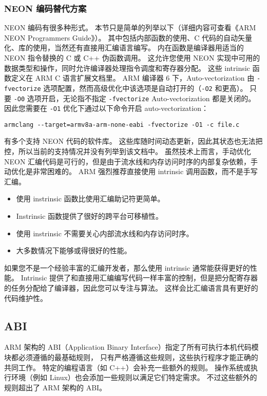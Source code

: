 \subsubsection{NEON 编码替代方案}

NEON 编码有很多种形式。
本节只是简单的列举以下（详细内容可查看《ARM NEON Programmers Guide》）。
其中包括内部函数的使用、C 代码的自动矢量化、库的使用，当然还有直接用汇编语言编写。
内在函数是编译器用适当的 NEON 指令替换的 C 或 C++ 伪函数调用。
这允许您使用 NEON 实现中可用的数据类型和操作，同时允许编译器处理指令调度和寄存器分配。
这些 intrinsic 函数定义在 ARM C 语言扩展文档里。
ARM 编译器 6 下，Auto-vectorization 由 \lstinline!-fvectorize! 选项配置，然而高级优化中该选项是自动打开的（\lstinline!-O2! 和更高）。
只要 \lstinline!-O0! 选项开启，无论指不指定 \lstinline!-fvectorize! Auto-vectorization 都是关闭的。
因此您需要在 \lstinline!-O1! 优化下通过以下命令开启 auto-vectorization：

\lstinline!armclang --target=armv8a-arm-none-eabi -fvectorize -O1 -c file.c!

有多个支持 NEON 代码的软件库。
这些库随时间动态更新，因此其状态也无法把控，所以当前的支持情况并没有列举到该文档中。
虽然技术上而言，手动优化 NEON 汇编代码是可行的，但是由于流水线和内存访问时序的内部复杂依赖，手动优化是非常困难的。
ARM 强烈推荐直接使用 intrinsic 调用函数，而不是手写汇编。

\begin{itemize}
  \item 使用 instrinsic 函数比使用汇编助记符更简单。
  \item Instrinsic 函数提供了很好的跨平台可移植性。
  \item 使用 instrinsic 不需要关心内部流水线和内存访问时序。
  \item 大多数情况下能够或得很好的性能。
\end{itemize}

如果您不是一个经验丰富的汇编开发者，那么使用 intrinsic 通常能获得更好的性能。
Intrinsic 提供了和直接用汇编编写代码一样丰富的控制，但是把分配寄存器的任务分配给了编译器，因此您可以专注与算法。
这样会比汇编语言具有更好的代码维护性。

\subsection{ABI}

ARM 架构的 ABI（Application Binary Interface）指定了所有可执行本机代码模块都必须遵循的最基础规则，
只有严格遵循这些规则，这些执行程序才能正确的共同工作。
特定的编程语言（如 C++）会补充一些额外的规则。
操作系统或执行环境（例如 Linux）也会添加一些规则以满足它们特定需求。
不过这些额外的规则超出了 ARM 架构的 ABI。


